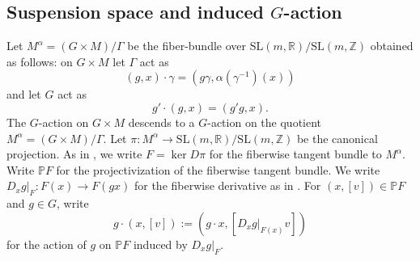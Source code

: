 \documentclass[10pt,reqno]{amsart}
\theoremstyle{Theorem}
\newtheorem{claim}[theorem]{Claim}
\theoremstyle{definition}
\theoremstyle{remark}
\newcommand{\restrict}[2]{{#1}{|_{{ #2}}}}
\DeclareMathOperator{\Id}{Id}
\newcommand{\R}{\mathbb {R}}
\newcommand{\Z}{\mathbb {Z}}
\newcommand{\Gl}{\mathrm{GL}}
\newcommand{\Sl}{\mathrm{SL}}
\newcommand{\inv}{^{-1}}
\newcommand{\id}{\mathrm{Id}}
\renewcommand\P{\mathbb{P}}
\def\red{\color{red}}
\begin{document}



\subsection{Suspension space and induced $G$-action} \label{sec:lolo}

 Let $M^{\alpha} = (G \times M)/\Gamma$ be the fiber-bundle over $\Sl(m,\R)/\Sl(m, \Z)$ obtained as follows: on $G\times M$ let $\Gamma$ act as
$$(g,x)\cdot \gamma = (g\gamma, \alpha(\gamma\inv)(x))$$
and let $G$ act as $$g'\cdot(g,x) = (g'g,x).$$
The $G$-action on $G\times M$ descends to a $G$-action  on the quotient $M^{\alpha} = (G \times M)/\Gamma$.
 Let $\pi\colon M^\alpha \to \Sl(m,\R)/\Sl(m, \Z)$ be the canonical projection.
As in \cite{BFH}, we   write  $F= \ker D\pi$ for the fiberwise tangent bundle to $M^{\alpha}$.  Write  $\P F$ for the projectivization of the fiberwise tangent bundle.
We write $\restrict { D_x g} F \colon F(x) \rightarrow F(gx)$ for the fiberwise derivative as in \cite{BFH}.  For $(x,[v])\in \P F$ and $g\in G$, write $$g\cdot (x,[v]) := (g\cdot x, [\restrict { D_x g} {F (x)} v])$$ for the action of $g$ on $\P F$ induced by $\restrict { D_x g} F$.
\end{document}

